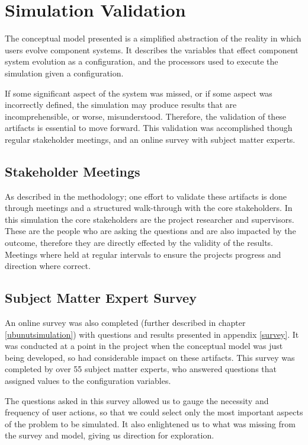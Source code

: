 \section{Simulation Validation}
The conceptual model presented is a simplified abstraction of the reality in which users evolve component systems.
It describes the variables that effect component system evolution as a configuration,
and the processors used to execute the simulation given a configuration.

If some significant aspect of the system was missed, or if some aspect was incorrectly defined, the simulation may produce results that are incomprehensible,
or worse, misunderstood.
Therefore, the validation of these artifacts is essential to move forward. 
This validation was accomplished though regular stakeholder meetings, and an online survey with subject matter experts.

\subsection{Stakeholder Meetings}
As described in the methodology; one effort to validate these artifacts is done through meetings and a structured walk-through with the core stakeholders.
In this simulation the core stakeholders are the project researcher and supervisors.
These are the people who are asking the questions and are also impacted by the outcome, therefore they are directly effected by the validity of the results.
Meetings where held at regular intervals to ensure the projects progress and direction where correct.

\subsection{Subject Matter Expert Survey}
An online survey was also completed (further described in chapter \ref{ubunutsimulation}) with questions and results presented in appendix \ref{survey}.
It was conducted at a point in the project when the conceptual model was just being developed, so had considerable impact on these artifacts.
This survey was completed by over 55 subject matter experts, who answered questions that assigned values to the configuration variables.

The questions asked in this survey allowed us to gauge the necessity and frequency of user actions,
so that we could select only the most important aspects of the problem to be simulated.
It also enlightened us to what was missing from the survey and model, giving us direction for exploration.

